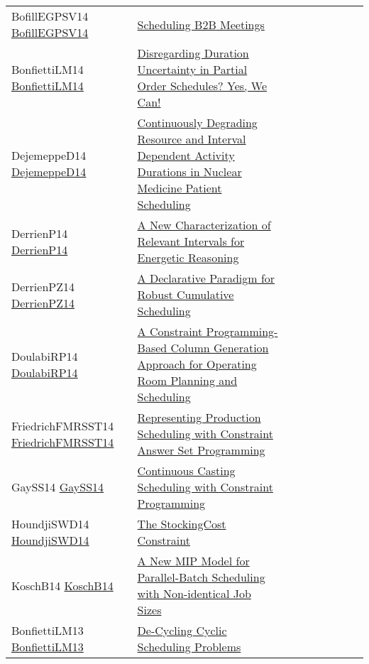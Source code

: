 {\begin{longtable}{p{3cm}p{7cm}lllllll}
BofillEGPSV14 \href{https://doi.org/10.1007/978-3-319-10428-7\_56}{BofillEGPSV14} &  \href{papers/BofillEGPSV14.pdf}{Scheduling {B2B} Meetings} &  &  &  &  &  &  & \\
BonfiettiLM14 \href{https://doi.org/10.1007/978-3-319-07046-9\_15}{BonfiettiLM14} &  \href{papers/BonfiettiLM14.pdf}{Disregarding Duration Uncertainty in Partial Order Schedules? Yes, We Can!} &  &  &  &  &  &  & \\
DejemeppeD14 \href{https://doi.org/10.1007/978-3-319-07046-9\_20}{DejemeppeD14} &  \href{papers/DejemeppeD14.pdf}{Continuously Degrading Resource and Interval Dependent Activity Durations in Nuclear Medicine Patient Scheduling} &  &  &  &  &  &  & \\
DerrienP14 \href{https://doi.org/10.1007/978-3-319-10428-7\_22}{DerrienP14} &  \href{papers/DerrienP14.pdf}{A New Characterization of Relevant Intervals for Energetic Reasoning} &  &  &  &  &  &  & \\
DerrienPZ14 \href{https://doi.org/10.1007/978-3-319-10428-7\_23}{DerrienPZ14} &  \href{papers/DerrienPZ14.pdf}{A Declarative Paradigm for Robust Cumulative Scheduling} &  &  &  &  &  &  & \\
DoulabiRP14 \href{https://doi.org/10.1007/978-3-319-07046-9\_32}{DoulabiRP14} &  \href{papers/DoulabiRP14.pdf}{A Constraint Programming-Based Column Generation Approach for Operating Room Planning and Scheduling} &  &  &  &  &  &  & \\
FriedrichFMRSST14 \href{https://doi.org/10.1007/978-3-319-28697-6\_23}{FriedrichFMRSST14} &  \href{}{Representing Production Scheduling with Constraint Answer Set Programming} &  &  &  &  &  &  & \\
GaySS14 \href{https://doi.org/10.1007/978-3-319-10428-7\_59}{GaySS14} &  \href{papers/GaySS14.pdf}{Continuous Casting Scheduling with Constraint Programming} &  &  &  &  &  &  & \\
HoundjiSWD14 \href{https://doi.org/10.1007/978-3-319-10428-7\_29}{HoundjiSWD14} &  \href{papers/HoundjiSWD14.pdf}{The StockingCost Constraint} &  &  &  &  &  &  & \\
KoschB14 \href{https://doi.org/10.1007/978-3-319-07046-9\_5}{KoschB14} &  \href{papers/KoschB14.pdf}{A New {MIP} Model for Parallel-Batch Scheduling with Non-identical Job Sizes} &  &  &  &  &  &  & \\
BonfiettiLM13 \href{http://www.aaai.org/ocs/index.php/ICAPS/ICAPS13/paper/view/6050}{BonfiettiLM13} &  \href{papers/BonfiettiLM13.pdf}{De-Cycling Cyclic Scheduling Problems} &  &  &  &  &  &  & \\

\end{longtable}}

